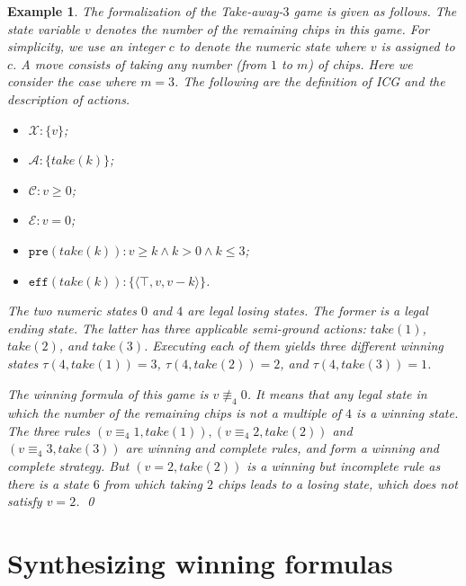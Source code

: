 \documentclass[review]{elsarticle}
\newcommand{\set}[1]{\{ #1 \}}
\newcommand{\tuple}[1]{\langle {#1} \rangle}
\newcommand{\true}{\top}
\newcommand{\statevar}{\mathcal{X}}
\newcommand{\act}{\mathcal{A}}
\newcommand{\constraint}{\mathcal{C}}
\newcommand{\estate}{\mathcal{E}}
\newcommand{\pre}{\mathtt{pre}}
\newcommand{\eff}{\mathtt{eff}}
\newcommand{\modulo}{\equiv}
\newcommand{\nmodulo}{\not \equiv}
\newtheorem{example}{Example}
\begin{document}
	\begin{example} \label{exm:take-away} \rm 	
		The formalization of the Take-away-$3$ game \cite{Gol1966} is given as follows.
		The state variable $v$ denotes the number of the remaining chips in this game. For simplicity, we use an integer $c$ to denote the numeric state where $v$ is assigned to $c$.
		A move consists of taking any number (from $1$ to $m$) of chips.
		Here we consider the case where $m = 3$. 
        The following are the definition of ICG and the description of actions.
		\begin{itemize}		    
            \item $\statevar: \set{v}$;
            \item $\act:\set{take(k)}$;
        	\item $\constraint: v \ge 0$;
        	\item $\estate: v = 0$;
			\item $\pre(take(k)): v \geq k \land k > 0 \land k \leq 3$;
			\item $\eff(take(k)): \set{\tuple{\true, v, v - k}}$.
		\end{itemize}		
        
		The two numeric states $0$ and $4$ are legal losing states.		
		The former is a legal ending state.
		The latter has three applicable semi-ground actions: $take(1)$, $take(2)$, and $take(3)$. 
		Executing each of them yields three different winning states $\tau(4, take(1)) = 3$, $\tau(4, take(2)) = 2$, and $\tau(4, take(3)) = 1$.
		
		The winning formula of this game is $v \nmodulo_4 0$.
		It means that any legal state in which the number of the remaining chips is not a multiple of $4$ is a winning state.
		The three rules $(v \modulo_4 1, take(1)), (v \modulo_4 2, take(2))$ and $(v \modulo_4 3, take(3))$ are winning and complete rules, and form a winning and complete strategy.
		But $(v = 2, take(2))$ is a winning but incomplete rule as there is a state $6$ from which taking $2$ chips leads to a losing state, which does not satisfy $v = 2$.
		\qed
	\end{example}
	
\section{Synthesizing winning formulas} 
	
\end{document}
